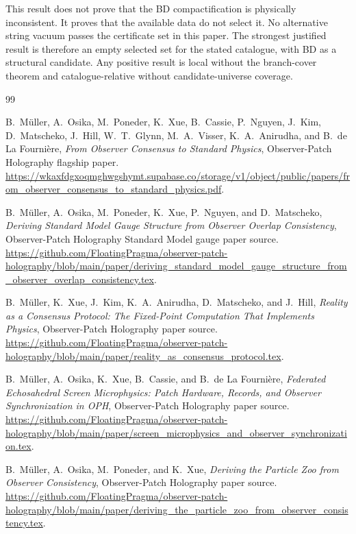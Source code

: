 \documentclass[11pt]{article}
\theoremstyle{remark}
\theoremstyle{plain}
\begin{document}
This result does not prove that the BD compactification is physically inconsistent. It proves that
the available data do not select it. No alternative string vacuum passes the certificate set in
this paper. The strongest justified result is therefore an empty selected set for the stated
catalogue, with BD as a structural candidate. Any positive result is local without
the branch-cover theorem and catalogue-relative without candidate-universe coverage.

\begin{thebibliography}{99}

B.\ M\"uller, A.\ Osika, M.\ Poneder, K.\ Xue, B.\ Cassie, P.\ Nguyen, J.\ Kim, D.\ Matscheko, J.\ Hill, W.\ T.\ Glynn, M.\ A.\ Visser, K.\ A.\ Anirudha, and B.\ de La Fourni\`ere,
\emph{From Observer Consensus to Standard Physics},
Observer-Patch Holography flagship paper.
\url{https://wkaxfdgxoqmghwgshymt.supabase.co/storage/v1/object/public/papers/from_observer_consensus_to_standard_physics.pdf}.

B.\ M\"uller, A.\ Osika, M.\ Poneder, K.\ Xue, P.\ Nguyen, and D.\ Matscheko,
\emph{Deriving Standard Model Gauge Structure from Observer Overlap Consistency},
Observer-Patch Holography Standard Model gauge paper source.
\url{https://github.com/FloatingPragma/observer-patch-holography/blob/main/paper/deriving_standard_model_gauge_structure_from_observer_overlap_consistency.tex}.

B.\ M\"uller, K.\ Xue, J.\ Kim, K.\ A.\ Anirudha, D.\ Matscheko, and J.\ Hill,
\emph{Reality as a Consensus Protocol: The Fixed-Point Computation That Implements Physics},
Observer-Patch Holography paper source.
\url{https://github.com/FloatingPragma/observer-patch-holography/blob/main/paper/reality_as_consensus_protocol.tex}.

B.\ M\"uller, A.\ Osika, K.\ Xue, B.\ Cassie, and B.\ de La Fourni\`ere,
\emph{Federated Echosahedral Screen Microphysics: Patch Hardware, Records, and Observer Synchronization in OPH},
Observer-Patch Holography paper source.
\url{https://github.com/FloatingPragma/observer-patch-holography/blob/main/paper/screen_microphysics_and_observer_synchronization.tex}.

B.\ M\"uller, A.\ Osika, M.\ Poneder, and K.\ Xue,
\emph{Deriving the Particle Zoo from Observer Consistency},
Observer-Patch Holography paper source.
\url{https://github.com/FloatingPragma/observer-patch-holography/blob/main/paper/deriving_the_particle_zoo_from_observer_consistency.tex}.


\end{thebibliography}
\end{document}

